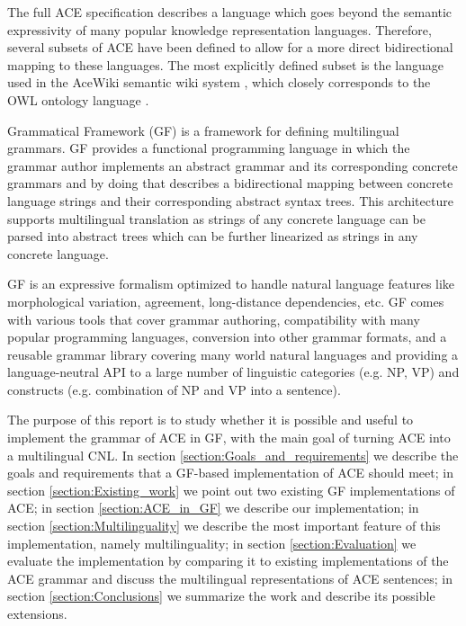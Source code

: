 \documentclass[a4paper]{article}
\begin{document}
The full ACE specification describes a language which goes beyond the semantic
expressivity of many popular knowledge representation languages. Therefore,
several subsets of ACE have been defined to allow for a more direct
bidirectional mapping to these languages. The most explicitly defined subset
is the language used in the AceWiki semantic wiki system
\cite{kuhn2010doctoralthesis}, which closely corresponds to the OWL ontology
language \cite{OWL_2_Web_Ontology_Language_Document_Overview}.

Grammatical Framework (GF) \cite{ranta:book2011}
is a framework for defining multilingual grammars.
GF provides a functional programming language in which
the grammar author implements an abstract grammar and its corresponding
concrete grammars and by doing that
describes a bidirectional mapping between concrete language strings and
their corresponding abstract syntax trees. This architecture supports
multilingual translation as strings of any concrete language can be parsed into
abstract trees which can be further linearized as strings in any concrete
language.

GF is an expressive formalism optimized to handle natural language features
like morphological variation, agreement, long-distance dependencies, etc.
GF comes with various tools that
cover grammar authoring, compatibility with many popular programming languages,
conversion into other grammar formats, and a reusable grammar library covering
many world natural languages and providing a language-neutral API to a large
number of linguistic categories (e.g. NP, VP) and constructs
(e.g. combination of NP and VP into a sentence).

The purpose of this report is to study whether it is possible and useful to
implement the grammar of ACE in GF, with the main goal of turning ACE into
a multilingual CNL.
In section \ref{section:Goals_and_requirements} we describe the goals and
requirements that a GF-based implementation of ACE should meet;
in section \ref{section:Existing_work} we point out two existing
GF implementations of ACE;
in section \ref{section:ACE_in_GF} we describe our implementation;
in section \ref{section:Multilinguality} we describe the most important feature
of this implementation, namely multilinguality;
in section \ref{section:Evaluation} we evaluate the implementation by comparing
it to existing implementations of the ACE grammar and discuss the multilingual
representations of ACE sentences;
in section \ref{section:Conclusions} we summarize the work and
describe its possible extensions.
\end{document}
